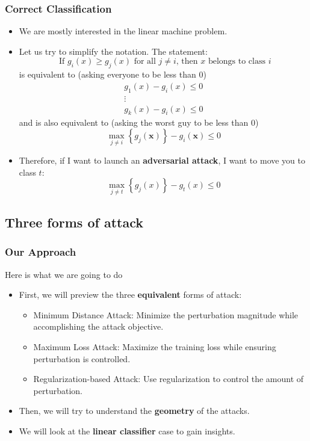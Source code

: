 \documentclass[8pt,dvipsnames]{beamer}
\begin{document}
\begin{frame}
	\frametitle{Correct Classification}
	\begin{itemize}
		\item We are mostly interested in the linear machine problem.
		\item Let us try to simplify the notation. The statement: 
		$$
		\text { If } g_{i}(x) \geq g_{j}(x) \text { for all } j \neq i \text {, then } x \text { belongs to class } i
		$$
		is equivalent to (asking everyone to be less than 0)
		$$
		\begin{array}{c}g_{1}(x)-g_{i}(x) \leq 0 \\ \vdots \\ g_{k}(x)-g_{i}(x) \leq 0\end{array}
		$$
		and is also equivalent to (asking the worst guy to be less than 0)
		$$
		\max _{j \neq i}\left\{g_{j}(\boldsymbol{x})\right\}-g_{i}(\boldsymbol{x}) \leq 0
		$$
		\item Therefore, if I want to launch an \textbf{adversarial attack}, I want to move you to class $t$: 
		$$
		\max _{j \neq t}\left\{g_{j}(x)\right\}-g_{t}(x) \leq 0
		$$
	\end{itemize}
\end{frame}

\subsection{Three forms of attack}
\begin{frame}
	\frametitle{Our Approach}
	Here is what we are going to do
	\begin{itemize}
		\item First, we will preview the three \textbf{equivalent} forms of attack: 
		\begin{itemize}
			\item Minimum Distance Attack: Minimize the perturbation magnitude while accomplishing the attack objective.
			\item Maximum Loss Attack: Maximize the training loss while ensuring perturbation is controlled.
			\item Regularization-based Attack: Use regularization to control the amount of perturbation.
		\end{itemize}
		\item Then, we will try to understand the \textbf{geometry} of the attacks. 
		\item We will look at the \textbf{linear classifier} case to gain insights.
	\end{itemize}
\end{frame}
\end{document}
